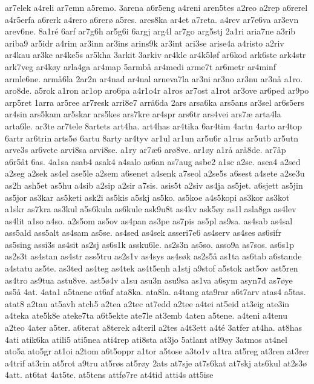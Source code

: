 {ar7elek
a4reli
ar7emn
a5remo.
3arena
a6r5eng
a4reni
aren5tes
a2reo
a2rep
a6rerel
a4r5erfa
a6rerk
a4rero
a6rer^^f8
a5res.
ares8ka
ar4et
a7reta.
a4rev
ar7e6va
ar3evn
arev6ne.
8a1r^^e9
6arf
ar7g6h
ar5g6i
6argj
arg4l
ar7go
arg5stj
2a1ri
aria7ne
a3rib
ariba9
ar5idr
a4rim
ar3inn
ar3ins
arins9k
ar3int
ari3se
arise4a
a4risto
a2riv
ar4kau
ar3ke
ar4ke5s
ar5kha
3arkit
3arkiv
ar4kle
ar4k5l^^f8f
ar6kod
ark6ste
ark4str
ark7veg
ar4k^^f8y
arla4ga
ar4map
5armb^^e5
ar4medi
arme7t
ar6metr
ar4minf
armle6ne.
arm^^e56la
2ar2n
ar4nad
ar4nal
arneva7la
ar3ni
ar3no
ar3nu
ar3n^^e5
a1ro.
aro8de.
a5rok
a1ron
ar1op
aro6pa
a4r1o4r
a1ros
ar7ost
a1rot
ar3ove
ar6ped
ar9po
arp5ret
1arra
ar5ree
ar7resk
arri8e7
arr^^e56da
2ars
arsa6ka
ars5ans
ar3sel
ar6s5ers
ar4sin
ars5kam
ar5skar
ars5kes
ars7kre
ar4spr
ars6tr
ars4vei
ars7^^e6
arta4la
arta6le.
ar3te
ar7tele
8artets
art4ha.
art4has
ar4tika
6ar4tim
4artn
4arto
ar4top
6artr
ar6trin
arts5^^f8
6artu
8arty
ar4tyv
ar1ul
ar1un
ar5u6r
a1rus
ar5utb
ar5utn
arve3s
ar6vete
arvi8sa
arvi8se.
a1ry
ar7^^e66
ar^^f88ve.
ar1^^f8y
a1r^^e5
ar^^e58de.
ar7^^e5p
a6r5^^e5t
6as.
4a1sa
asab4
asak4
a4salo
as6an
as7aug
asbe2
a1sc
a2se.
asea4
a2sed
a2seg
a2sek
as4el
ase5le
a2sem
a6senet
a4senk
a7seol
a2se5s
a6sest
a4sete
a2se3u
as2h
ash5et
as5hu
a4sib
a2sip
a2sir
a7sis.
asis5t
a2siv
as4ja
as5jet.
a6sjett
as5jin
as5jor
as3kar
as5keti
ask2i
as5kis
a5skj
as5ko.
as5koe
a4s5kopi
as3kor
as3kot
a1skr
as7kra
as3kul
a5s6kula
as6kule
ask9u8t
as4kv
ask5^^f8y
as1l
asla8ga
as4lev
as4lit
a1so
a4so.
a2s5om
as5ov
as4pan
as3pe
as7pis
as5pl
as9sa.
as4sab
as4sal
ass5ald
ass5alt
as4sam
as5se.
as4sed
as4sek
asseri7e6
as4serv
as4ses
as6sifr
as5sing
assi3s
as4sit
as2sj
as6s1k
assku6le.
as2s3n
as5so.
asso9a
as7sos.
as6s1p
as2s3t
as4stan
as4str
ass5tru
as2s1v
as4sys
as4s^^f8k
as2s5^^e5
as1ta
as6tab
a6stande
a4statu
as5te.
as3ted
as4teg
as4tek
as4t5enh
a1stj
a9stof
a5stok
ast5ov
ast5ren
as4tro
as9tua
astu8ve.
ast5^^f84v
a1su
asu3n
asu9sa
as1va
a6sym
asyn7d
as7^^f8ye
as5^^e5
4at.
4ata1
a5taene
at6af
ata8ka.
ata8la.
a4tang
ata9rar
a6t7arv
atas4
a5tas.
atat8
a2tau
at5avh
atch5
a2tea
a2tec
at7edd
a2tee
a4tei
at5eid
at3eig
ate3in
a4teka
ate5k8e
ateke7ta
a6t5ekte
ate7le
at3emb
4aten
a5tene.
a4teni
a4tenu
a2teo
4ater
a5ter.
a6terat
a8terek
a4teril
a2tes
a4t3ett
a4t^^e9
3atfer
at4ha.
at8has
4ati
atik6ka
atili5
ati5nea
ati4rep
ati8sta
at3jo
5atlant
atl9^^f8y
3atmos
at4nel
ato5a
ato5gr
at1oi
a2tom
a6t5oppr
a1tor
a5tose
a3to1v
a1tra
at5reg
at3ren
at3rer
a4trif
at3rin
at5rot
a9tru
at5r^^f8s
at5r^^f8y
2ats
at7sje
at7s6kat
at7skj
ats6kul
at2s3^^f8
4att.
at6tat
4at5te.
at5tens
attf^^f87re
at4tid
atti4s
att5ise
}

